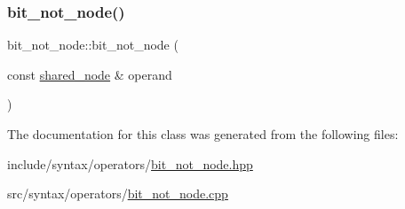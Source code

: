 \subsubsection{\texorpdfstring{bit\+\_\+not\+\_\+node()}{bit\_not\_node()}}
{\footnotesize\ttfamily bit\+\_\+not\+\_\+node\+::bit\+\_\+not\+\_\+node (\begin{DoxyParamCaption}\item[{const \hyperlink{namespacejawe_a3f307481d921b6cbb50cc8511fc2b544}{shared\+\_\+node} \&}]{operand }\end{DoxyParamCaption})}



The documentation for this class was generated from the following files\+:\begin{DoxyCompactItemize}
\item 
include/syntax/operators/\hyperlink{bit__not__node_8hpp}{bit\+\_\+not\+\_\+node.\+hpp}\item 
src/syntax/operators/\hyperlink{bit__not__node_8cpp}{bit\+\_\+not\+\_\+node.\+cpp}\end{DoxyCompactItemize}
